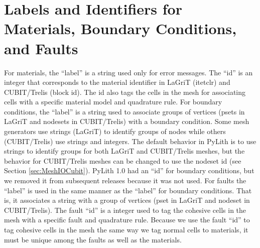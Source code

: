 \section{Labels and Identifiers for Materials, Boundary Conditions, and Faults}

For materials, the ``label'' is a string used only for error messages.
The ``id'' is an integer that corresponds to the material identifier
in LaGriT (itetclr) and CUBIT/Trelis (block id). The id also tags the
cells in the mesh for associating cells with a specific material model
and quadrature rule. For boundary conditions, the ``label'' is a
string used to associate groups of vertices (psets in LaGriT and
nodesets in CUBIT/Trelis) with a boundary condition. Some mesh
generators use strings (LaGriT) to identify groups of nodes while
others (CUBIT/Trelis) use strings and integers. The default behavior
in PyLith is to use strings to identify groups for both LaGriT and
CUBIT/Trelis meshes, but the behavior for CUBIT/Trelis meshes can be
changed to use the nodeset id (see Section \vref{sec:MeshIOCubit}).
PyLith 1.0 had an ``id'' for boundary conditions, but we removed it
from subsequent releases because it was not used. For faults the
``label'' is used in the same manner as the ``label'' for boundary
conditions. That is, it associates a string with a group of vertices
(pset in LaGriT and nodeset in CUBIT/Trelis). The fault ``id'' is a
integer used to tag the cohesive cells in the mesh with a specific
fault and quadrature rule. Because we use the fault ``id'' to tag
cohesive cells in the mesh the same way we tag normal cells to
materials, it must be unique among the faults as well as the
materials.


